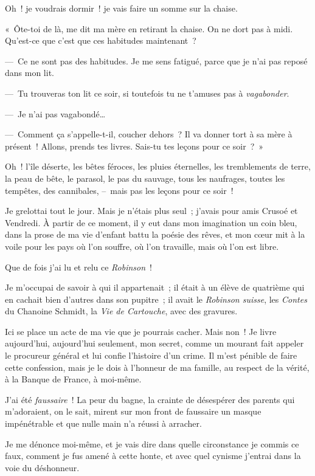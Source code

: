 \documentclass[french,twoside]{book} %
\begin{document}
Oh ! je voudrais dormir ! je vais faire un somme sur la chaise.\par
« Ôte-toi de là, me dit ma mère en retirant la chaise. On ne dort pas à midi. Qu’est-ce que c’est que ces habitudes maintenant ?\par
— Ce ne sont pas des habitudes. Je me sens fatigué, parce que je n’ai pas reposé dans mon lit.\par
— Tu trouveras ton lit ce soir, si toutefois tu ne t’amuses pas à \emph{vagabonder}.\par
— Je n’ai pas vagabondé…\par
— Comment ça s’appelle-t-il, coucher dehors ? Il va donner tort à sa mère à présent ! Allons, prends tes livres. Sais-tu tes leçons pour ce soir ? »\par
\bigbreak
\noindent Oh ! l’île déserte, les bêtes féroces, les pluies éternelles, les tremblements de terre, la peau de bête, le parasol, le pas du sauvage, tous les naufrages, toutes les tempêtes, des cannibales, – mais pas les leçons pour ce soir !\par
Je grelottai tout le jour. Mais je n’étais plus seul ; j’avais pour amis Crusoé et Vendredi. À partir de ce moment, il y eut dans mon imagination un coin bleu, dans la prose de ma vie d’enfant battu la poésie des rêves, et mon cœur mit à la voile pour les pays où l’on souffre, où l’on travaille, mais où l’on est libre.\par
Que de fois j’ai lu et relu ce \emph{Robinson} !\par
Je m’occupai de savoir à qui il appartenait ; il était à un élève de quatrième qui en cachait bien d’autres dans son pupitre ; il avait le \emph{Robinson suisse}, les \emph{Contes} du Chanoine Schmidt, la \emph{Vie de Cartouche}, avec des gravures.\par
Ici se place un acte de ma vie que je pourrais cacher. Mais non ! Je livre aujourd’hui, aujourd’hui seulement, mon secret, comme un mourant fait appeler le procureur général et lui confie l’histoire d’un crime. Il m’est pénible de faire cette confession, mais je le dois à l’honneur de ma famille, au respect de la vérité, à la Banque de France, à moi-même.\par
J’ai été \emph{faussaire} ! La peur du bagne, la crainte de désespérer des parents qui m’adoraient, on le sait, mirent sur mon front de faussaire un masque impénétrable et que nulle main n’a réussi à arracher.\par
Je me dénonce moi-même, et je vais dire dans quelle circonstance je commis ce faux, comment je fus amené à cette honte, et avec quel cynisme j’entrai dans la voie du déshonneur.\par
\end{document}
